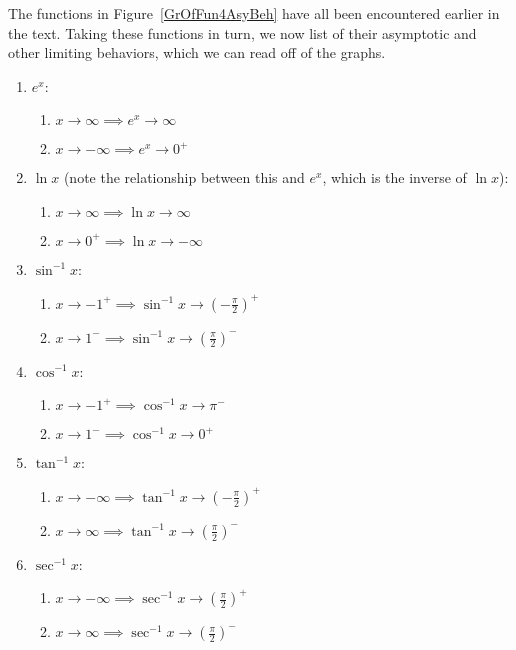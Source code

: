 The functions in Figure~\ref{GrOfFun4AsyBeh} have all been 
encountered earlier in the text.  Taking these functions in turn, we 
now list  of their asymptotic and other limiting
behaviors, which we can read off of the
graphs.  
\newpage
\begin{enumerate} 
\item $e^x$:
   \begin{enumerate}
   \item $x\to\infty\implies e^x\to\infty$
   \item $x\to-\infty\implies e^x\to0^+$
   \end{enumerate}
\item $\ln x$ (note the relationship between this and $e^x$, 
   which is the inverse of $\ln x$):
   \begin{enumerate}
   \item $x\to\infty\implies\ln x\to\infty$
   \item $x\to0^+\implies\ln x\to-\infty$
   \end{enumerate}
\item $\sin^{-1}x$:
   \begin{enumerate}
   \item $x\to-1^+\implies\sin^{-1}x\to\left(-\frac{\pi}{2}\right)^+$
   \item $x\to1^-\implies\sin^{-1}x\to\left(\frac{\pi}{2}\right)^-$
   \end{enumerate}
\item $\cos^{-1}x$:
   \begin{enumerate}
   \item $x\to-1^+\implies\cos^{-1}x\to\pi^-$
   \item $x\to1^-\implies\cos^{-1}x\to0^+$
   \end{enumerate}
\item $\tan^{-1}x$:
   \begin{enumerate}
   \item $x\to-\infty\implies\tan^{-1}x\to\left(-\frac{\pi}2\right)^+$
   \item $x\to\infty\implies\tan^{-1}x\to\left(\frac{\pi}2\right)^-$
   \end{enumerate}
\item $\sec^{-1}x$:
   \begin{enumerate}
   \item $x\to-\infty\implies\sec^{-1}x\to\left(\frac{\pi}2\right)^+$
   \item $x\to\infty\implies\sec^{-1}x\to\left(\frac{\pi}2\right)^-$
   \end{enumerate}
\end{enumerate}

